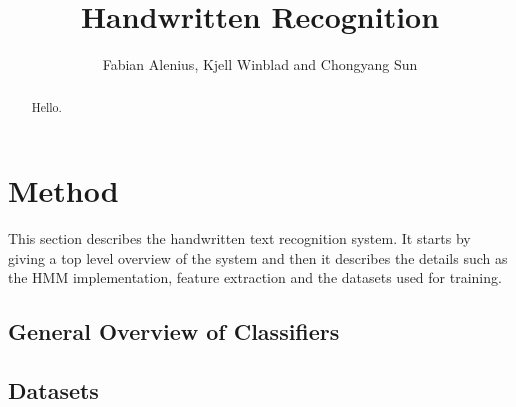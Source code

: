 \documentclass[11pt]{article}
\author{Fabian Alenius, Kjell Winblad and Chongyang Sun} \title{Handwritten Recognition}
\begin{document}
\maketitle

\begin{abstract}
Hello.

\end{abstract}






\section{Method}\label{sec:method}

This section describes the handwritten text recognition system. It starts by giving a top level overview of the system and then it describes the details such as the HMM implementation, feature extraction and the datasets used for training. 


\subsection{General Overview of Classifiers}\label{sec:overview_of_classifiers}







\subsection{Datasets}\label{sec:dataset}
\end{document}
